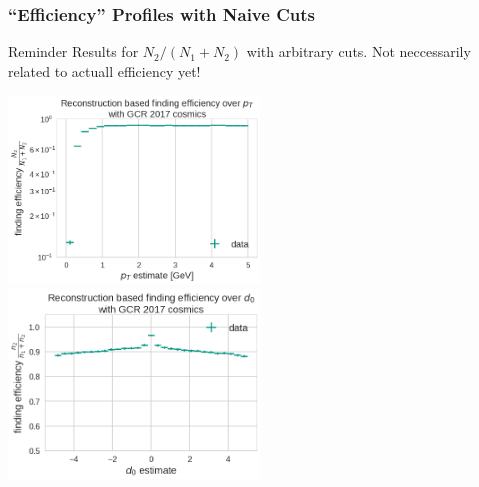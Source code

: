 \documentclass[18pt]{beamer}
\begin{document}
  \begin{frame}
    \frametitle{``Efficiency'' Profiles with Naive Cuts}
    \begin{alertblock}{Reminder}
      Results for $N_2 / (N_1 + N_2)$ with arbitrary cuts. Not neccessarily related to actuall efficiency yet!
    \end{alertblock}
    \begin{center}
      \includegraphics[width=0.5\textwidth]{figures/findeff_pt_data.png}
      \includegraphics[width=0.5\textwidth]{figures/findeff_d0_data.png}
    \end{center}
  \end{frame}
\end{document}

